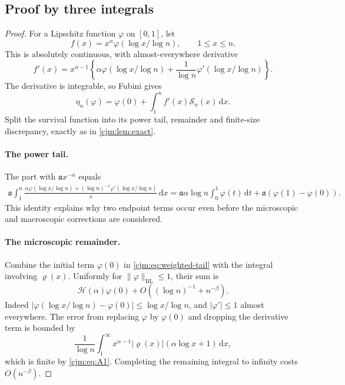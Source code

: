 \documentclass[11pt,a4paper]{article}
\theoremstyle{definition}\newaliascnt{definition}{theorem}
\theoremstyle{remark}\newaliascnt{remark}{theorem}
\newcommand{\dd}{\mathrm d}
\newcommand{\cjBL}{\mathrm{BL}}
\begin{document}
\subsection{Proof by three integrals}
\begin{proof}
For a Lipschitz function $\varphi$ on
$[0,1]$, let
\[
 f(x)=x^\alpha\varphi(\log x/\log n),\qquad1\le x\le n.
\]
This is absolutely continuous, with almost-everywhere derivative
\begin{equation}
 f'(x)=x^{\alpha-1}
 \left\{\alpha\varphi(\log x/\log n)+\frac1{\log n}\varphi'(\log x/\log n)\right\}.
 \label{cjm:eq:f-derivative}
\end{equation}
The derivative is integrable, so Fubini gives
\begin{equation}
 \eta_n(\varphi)=\varphi(0)+\int_1^n f'(x)\mathcal S_n(x)\,\dd x.
 \label{cjm:eq:weighted-tail}
\end{equation}
Split the survival function into its power tail, remainder and finite-size
discrepancy, exactly as in \cref{cjm:lem:exact}.

\paragraph{The power tail.}
The part with $\mathfrak a x^{-\alpha}$ equals
\begin{align}
 \mathfrak a\int_1^n\frac{\alpha\varphi(\log x/\log n)+(\log n)^{-1}\varphi'(\log x/\log n)}{x}\,\dd x
 =\mathfrak a\alpha\log n\int_0^1\varphi(t)\,\dd t+\mathfrak a(\varphi(1)-\varphi(0)).
 \label{cjm:eq:measure-power}
\end{align}
This identity explains why two endpoint terms occur even before the
microscopic and macroscopic corrections are considered.

\paragraph{The microscopic remainder.}
Combine the initial term $\varphi(0)$ in \eqref{cjm:eq:weighted-tail} with
the integral involving $\varrho(x)$. Uniformly for
$\|\varphi\|_{\cjBL}\le1$, their sum is
\begin{equation}
 \mathcal H(\alpha)\varphi(0)+O((\log n)^{-1}+n^{-\beta}).
 \label{cjm:eq:measure-micro}
\end{equation}
Indeed $|\varphi(\log x/\log n)-\varphi(0)|\le\log x/\log n$, and
$|\varphi'|\le1$ almost everywhere. The error from replacing $\varphi$
by $\varphi(0)$ and dropping the derivative term is bounded by
\[
 \frac1{\log n}\int_1^\infty x^{\alpha-1}|\varrho(x)|(\alpha\log x+1)\,\dd x,
\]
which is finite by \eqref{cjm:eq:A1}. Completing the remaining integral to
infinity costs $O(n^{-\beta})$.


\end{proof}
\end{document}
